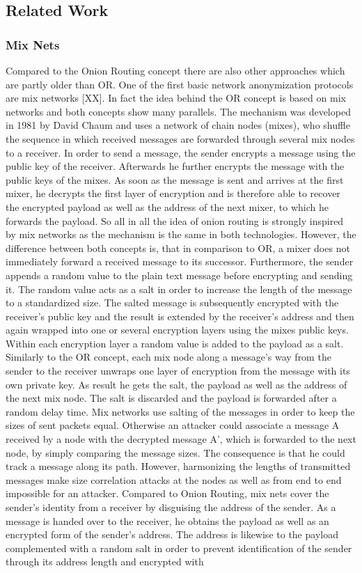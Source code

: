 \documentclass{sig-alternate}
\begin{document}
\subsection {Related Work}
 \subsubsection {Mix Nets}
Compared to the Onion Routing concept there are also other approaches which are partly older than OR. One of the first basic network anonymization protocols are mix networks [XX]. In fact the idea behind the OR concept is based on mix networks and both concepts show many parallels. The mechanism was developed in 1981 by David Chaum and uses a network of chain nodes (mixes), who shuffle the sequence in which received messages are forwarded through several mix nodes to a receiver. In order to send a message, the sender encrypts a message using the public key of the receiver. Afterwards he further encrypts the message with the public keys of the mixes. As soon as the message is sent and arrives at the first mixer, he decrypts the first layer of encryption and is therefore able to recover the encrypted payload as well as the address of the next mixer, to which he forwards the payload. So all in all the idea of onion routing is strongly inspired by mix networks as the mechanism is the same in both technologies. However, the difference between both concepts is, that in comparison to OR, a mixer does not immediately forward a received message to its successor. Furthermore, the sender appends a random value to the plain text message before encrypting and sending it. The random value acts as a salt in order to increase the length of the message to a standardized size. The salted message is subsequently encrypted with the receiver’s public key and the result is extended by the receiver’s address and then again wrapped into one or several encryption layers using the mixes public keys. Within each encryption layer a random value is added to the payload as a salt. Similarly to the OR concept, each mix node along a message’s way from the sender to the receiver unwraps one layer of encryption from the message with its own private key. As result he gets the salt, the payload as well as the address of the next mix node. The salt is discarded and the payload is forwarded after a random delay time. Mix networks use salting of the messages in order to keep the sizes of sent packets equal. Otherwise an attacker could associate a message A received by a node with the decrypted message A’, which is forwarded to the next node, by simply comparing the message sizes. The consequence is that he could track a message along its path. However, harmonizing the lengths of transmitted messages make size correlation attacks at the nodes as well as from end to end impossible for an attacker. Compared to Onion Routing, mix nets cover the sender’s identity from a receiver by disguising the address of the sender. As a message is handed over to the receiver, he obtains the payload as well as an encrypted form of the sender’s address. The address is likewise to the payload complemented with a random salt in order to prevent identification of the sender through its address length and encrypted with 
\end{document}
